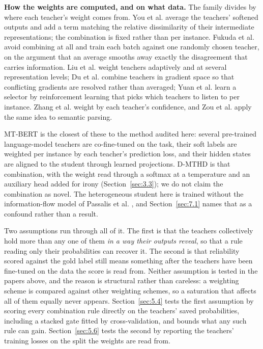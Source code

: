 \textbf{How the weights are computed, and on what data.} The family divides by where each teacher's weight comes from. You et al. \cite{you2017learning} average
the teachers' softened outputs and add a term matching the relative dissimilarity of their intermediate
representations; the combination is fixed rather than per instance. Fukuda et al.
\cite{fukuda2017efficient} avoid combining at all and train each batch against one randomly chosen
teacher, on the argument that an average smooths away exactly the disagreement that carries information.
Liu et al. \cite{liu2020adaptive} weight teachers adaptively and at several representation levels; Du et
al. \cite{du2020agree} combine teachers in gradient space so that conflicting gradients are resolved
rather than averaged; Yuan et al. \cite{yuan2021reinforced} learn a selector by reinforcement learning
that picks which teachers to listen to per instance. Zhang et al. \cite{zhang2022confidence} weight by
each teacher's confidence, and Zou et al. \cite{zou2025dynamic} apply the same idea to semantic parsing.

MT-BERT \cite{wu2021one} is the closest of these to the method audited here: several pre-trained
language-model teachers are co-fine-tuned on the task, their soft labels are weighted per instance by
each teacher's prediction loss, and their hidden states are aligned to the student through learned
projections. D-MTHD is that combination, with the weight read through a softmax at a temperature and an
auxiliary head added for irony (Section~\ref{sec:3.3}); we do not claim the combination as novel.
The heterogeneous student here is trained without the information-flow model of Passalis et al.
\cite{passalis2020heterogeneous}, and Section~\ref{sec:7.1} names that as a confound rather than a
result.

Two assumptions run through all of it. The first is that the teachers collectively hold more than any one
of them \emph{in a way their outputs reveal}, so that a rule reading only their probabilities can
recover it. The second is that reliability scored against the gold label still means something after the
teachers have been fine-tuned on the data the score is read from. Neither assumption is tested in the
papers above, and the reason is structural rather than careless: a weighting scheme is compared against
other weighting schemes, so a saturation that affects all of them equally never appears.
Section~\ref{sec:5.4} tests the first assumption by scoring every combination rule directly on the
teachers' saved probabilities, including a stacked gate fitted by cross-validation, and bounds what any
such rule can gain. Section~\ref{sec:5.6} tests the second by reporting the teachers' training losses on
the split the weights are read from.


